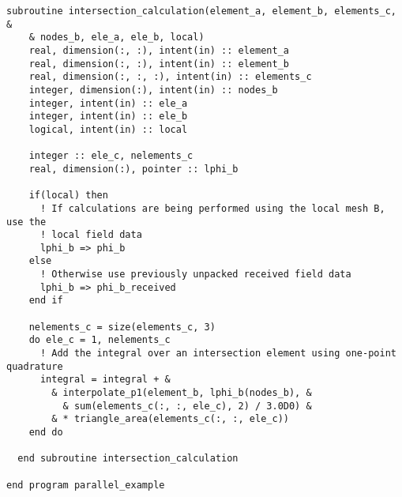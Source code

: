 \documentclass{article}
\begin{document}
\begin{lstlisting}[language=FORTRAN] 
  subroutine intersection_calculation(element_a, element_b, elements_c, &
    & nodes_b, ele_a, ele_b, local)
    real, dimension(:, :), intent(in) :: element_a
    real, dimension(:, :), intent(in) :: element_b
    real, dimension(:, :, :), intent(in) :: elements_c
    integer, dimension(:), intent(in) :: nodes_b
    integer, intent(in) :: ele_a
    integer, intent(in) :: ele_b
    logical, intent(in) :: local

    integer :: ele_c, nelements_c
    real, dimension(:), pointer :: lphi_b
    
    if(local) then
      ! If calculations are being performed using the local mesh B, use the
      ! local field data
      lphi_b => phi_b
    else
      ! Otherwise use previously unpacked received field data
      lphi_b => phi_b_received
    end if

    nelements_c = size(elements_c, 3)
    do ele_c = 1, nelements_c
      ! Add the integral over an intersection element using one-point quadrature
      integral = integral + &
        & interpolate_p1(element_b, lphi_b(nodes_b), &
          & sum(elements_c(:, :, ele_c), 2) / 3.0D0) &
        & * triangle_area(elements_c(:, :, ele_c))
    end do    
    
  end subroutine intersection_calculation
  
end program parallel_example
\end{lstlisting}
\end{document}

